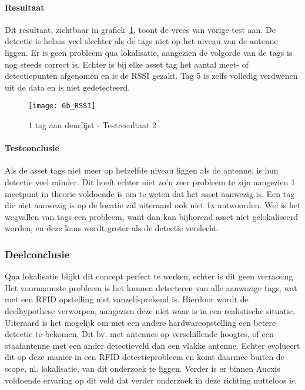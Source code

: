 \paragraph{Resultaat}
Dit resultaat, zichtbaar in grafiek~\ref{fig:ond-rfid-dynamic-6b-res}, toont de vrees van vorige test aan. De detectie is helaas veel slechter als de tags niet op het niveau van de antenne liggen. Er is geen probleem qua lokalisatie, aangezien de volgorde van de tags is nog steeds correct is. Echter is bij elke asset tag het aantal meet- of detectiepunten afgenomen en is de RSSI gezakt. Tag 5 is zelfs volledig verdwenen uit de data en is niet gedetecteerd.
\begin{figure}[h]
	\texttt{[image: 6b\_RSSI]}
	\caption{1 tag aan deurlijst - Testresultaat 2}
	\label{fig:ond-rfid-dynamic-6b-res}
\end{figure}

\paragraph{Testconclusie}
Als de asset tags niet meer op hetzelfde niveau liggen als de antenne, is hun detectie veel minder. Dit hoeft echter niet zo'n zeer probleem te zijn aangezien 1 meetpunt in theorie voldoende is om te weten dat het asset aanwezig is. Een tag die niet aanwezig is op de locatie zal uiteraard ook niet 1x antwoorden. Wel is het wegvallen van tags een probleem, want dan kan bijhorend asset niet gelokaliseerd worden, en deze kans wordt groter als de detectie verslecht.

\subsubsection{Deelconclusie}
Qua lokalisatie blijkt dit concept perfect te werken, echter is dit geen verrassing. Het voornaamste probleem is het kunnen detecteren van alle aanwezige tags, wat met een RFID opstelling niet vanzelfsprekend is. Hierdoor wordt de deelhypothese verworpen, aangezien deze niet waar is in een realistische situatie. Uiteraard is het mogelijk om met een andere hardwareopstelling een betere detectie te bekomen. Dit bv. met antennes op verschillende hoogtes, of een staafantenne met een ander detectieveld dan een vlakke antenne. Echter evolueert dit op deze manier in een RFID detectieprobleem en komt daarmee buiten de scope, nl. lokalisatie, van dit onderzoek te liggen. Verder is er binnen Aucxis voldoende ervaring op dit veld dat verder onderzoek in deze richting nutteloos is.

